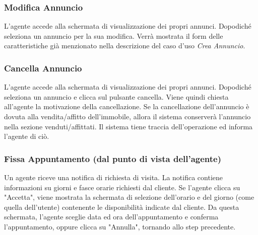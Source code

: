 \subsubsection{Modifica Annuncio}
L'agente accede alla schermata di visualizzazione dei propri annunci. Dopodiché 
seleziona un annuncio per la sua modifica. Verrà mostrata il form delle 
caratteristiche già menzionato nella descrizione del caso d'uso \textit{Crea Annuncio}.

\subsubsection{Cancella Annuncio}
L'agente accede alla schermata di visualizzazione dei propri annunci. Dopodiché 
seleziona un annuncio e clicca sul pulsante cancella. Viene quindi chiesta all'agente 
la motivazione della cancellazione. 
Se la cancellazione dell'annuncio è dovuta alla vendita/affitto dell'immobile, 
allora il sistema conserverà l'annuncio nella sezione venduti/affittati. Il 
sistema tiene traccia dell'operazione ed informa l'agente di ciò.

\subsubsection{Fissa Appuntamento (dal punto di vista dell'agente)}
Un agente riceve una notifica di richiesta di visita.
La notifica contiene informazioni su giorni e fasce orarie richiesti
dal cliente.
Se l'agente clicca su "Accetta", viene mostrata la schermata di selezione dell'orario e del giorno (come quella dell'utente) contenente le disponibilità indicate dal cliente. Da questa schermata, l'agente sceglie data ed ora dell'appuntamento e conferma l'appuntamento, oppure clicca su "Annulla", tornando allo step precedente.
